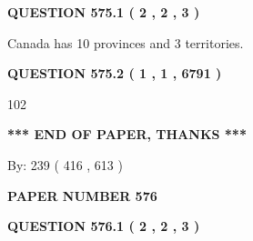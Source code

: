 \documentclass[12pt]{article}
\begin{document}
{\textbf{\Large{QUESTION
575.1 
 ( 2 , 2 , 3 )
}}}
  
  
 
 
\noindent{}
 
 
Canada has 10  provinces and 3 territories.
 
 
 
 
  
\vspace{0.2in}
  
{\textbf{\Large{QUESTION
575.2 
 ( 1 , 1 , 6791 )
}}}
  
  
 
 
\noindent{}

102
 
 
   
   
 \vspace{0.2in}
 
   
   
   
   
\vspace{1.0in} 
{\textbf{\large{ *** END OF PAPER, THANKS *** }}} 
   
   
\hspace{1.0in} By: 
 239 ( 416 ,  613 )
   
   
   
   
\newpage 
\setcounter{page}{ 
   576001 } 
   
   
   
   
 {\textbf{ \Large{ PAPER NUMBER  576  }}}
   
   
\vspace{0.2in}
   
   
   
   
   
   
 \vspace{0.2in}
 
 
 
 
   
   
  
\vspace{0.2in}
  
{\textbf{\Large{QUESTION
576.1 
 ( 2 , 2 , 3 )
}}}
  
  
 
 
\noindent{}
 
\end{document}
